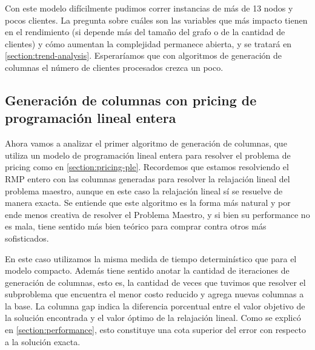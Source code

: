 Con este modelo difícilmente pudimos correr instancias de más de 13 nodos y pocos clientes. La pregunta sobre cuáles son las variables que más impacto tienen en el rendimiento (si depende más del tamaño del grafo o de la cantidad de clientes) y cómo aumentan la complejidad permanece abierta, y se tratará en \ref{section:trend-analysis}. Esperaríamos que con algoritmos de generación de columnas el número de clientes procesados crezca un poco.

\subsection{Generación de columnas con pricing de programación lineal entera}
\label{section:experiment-pricing-ple}

Ahora vamos a analizar el primer algoritmo de generación de columnas, que utiliza un modelo de programación lineal entera para resolver el problema de pricing como en \ref{section:pricing-ple}. Recordemos que estamos resolviendo el RMP entero con las columnas generadas para resolver la relajación lineal del problema maestro, aunque en este caso la relajación lineal sí se resuelve de manera exacta. Se entiende que este algoritmo es la forma más natural y por ende menos creativa de resolver el Problema Maestro, y si bien su performance no es mala, tiene sentido más bien teórico para comprar contra otros más sofisticados.

En este caso utilizamos la misma medida de tiempo determinístico que para el modelo compacto. Además tiene sentido anotar la cantidad de iteraciones de generación de columnas, esto es, la cantidad de veces que tuvimos que resolver el subproblema que encuentra el menor costo reducido y agrega nuevas columnas a la base. La columna gap indica la diferencia porcentual entre el valor objetivo de la solución encontrada y el valor óptimo de la relajación lineal. Como se explicó en \ref{section:performance}, esto constituye una cota superior del error con respecto a la solución exacta. 

